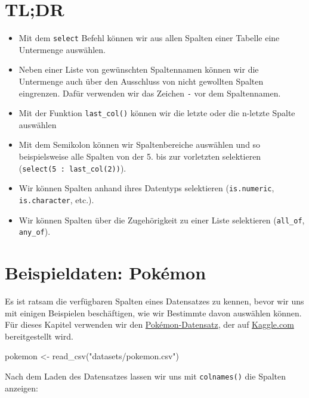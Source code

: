 \documentclass[
]{book}
\newenvironment{Shaded}{\begin{snugshade}}{\end{snugshade}}
\newcommand{\FunctionTok}[1]{\textcolor[rgb]{0.00,0.00,0.00}{#1}}
\newcommand{\NormalTok}[1]{#1}
\newcommand{\OtherTok}[1]{\textcolor[rgb]{0.56,0.35,0.01}{#1}}
\newcommand{\StringTok}[1]{\textcolor[rgb]{0.31,0.60,0.02}{#1}}
\providecommand{\tightlist}{%
  \setlength{\itemsep}{0pt}\setlength{\parskip}{0pt}}
\begin{document}
\hypertarget{tldr-3}{%
\section*{TL;DR}\label{tldr-3}}

\begin{itemize}
\tightlist
\item
  Mit dem \texttt{select} Befehl können wir aus allen Spalten einer Tabelle eine Untermenge auswählen.
\item
  Neben einer Liste von gewünschten Spaltennamen können wir die Untermenge auch über den Ausschluss von nicht gewollten Spalten eingrenzen. Dafür verwenden wir das Zeichen \texttt{-} vor dem Spaltennamen.
\item
  Mit der Funktion \texttt{last\_col()} können wir die letzte oder die n-letzte Spalte auswählen
\item
  Mit dem Semikolon können wir Spaltenbereiche auswählen und so beispielsweise alle Spalten von der 5. bis zur vorletzten selektieren (\texttt{select(5\ :\ last\_col(2))}).
\item
  Wir können Spalten anhand ihres Datentyps selektieren (\texttt{is.numeric}, \texttt{is.character}, etc.).
\item
  Wir können Spalten über die Zugehörigkeit zu einer Liste selektieren (\texttt{all\_of}, \texttt{any\_of}).
\end{itemize}

\hypertarget{beispieldaten-pokuxe9mon}{%
\section{Beispieldaten: Pokémon}\label{beispieldaten-pokuxe9mon}}

Es ist ratsam die verfügbaren Spalten eines Datensatzes zu kennen, bevor wir uns mit einigen Beispielen beschäftigen, wie wir Bestimmte davon auswählen können. Für dieses Kapitel verwenden wir den \href{https://www.kaggle.com/rounakbanik/pokemon/version/1}{Pokémon-Datensatz}, der auf \href{https://kaggle.com/}{Kaggle.com} bereitgestellt wird.

\begin{Shaded}
\begin{Highlighting}[]
\NormalTok{pokemon }\OtherTok{\textless{}{-}} \FunctionTok{read\_csv}\NormalTok{(}\StringTok{"datasets/pokemon.csv"}\NormalTok{)}
\end{Highlighting}
\end{Shaded}

Nach dem Laden des Datensatzes lassen wir uns mit \texttt{colnames()} die Spalten anzeigen:
\end{document}
